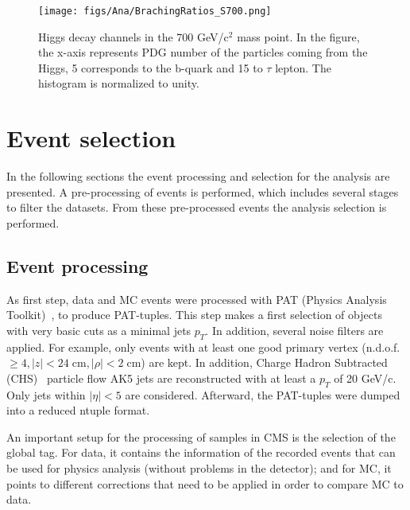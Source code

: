 \begin{figure}[!Hhtbp]
  \begin{center}
    \texttt{[image: figs/Ana/BrachingRatios\_S700.png]}
    \caption{Higgs decay channels in the 700 GeV/$\text{c}^{2}$ mass point. In the figure, the x-axis represents PDG number of the particles coming from the Higgs, 5 corresponds to the b-quark and 15 to $\tau$ lepton. The histogram is normalized to unity.}
    \label{fig:BR_Higgs_SignalSamples}
  \end{center}
\end{figure}


\section{Event selection}
\label{sec:sel}

In the following sections the event processing and selection for the analysis are presented. A pre-processing of events is performed, which includes several stages to filter the datasets. From these pre-processed events the analysis selection is performed.

\subsection{Event processing}

As first step, data and MC events were processed with PAT (Physics Analysis Toolkit)~\cite{Adam:2010zza}, to produce PAT-tuples. This step makes a first selection of objects with very basic cuts as a minimal jets $p_{T}$. In addition, several noise filters are applied. For example, only events with at least one good primary vertex (n.d.o.f. $\ge 4, |z|<24 \;\text{cm}, |\rho|< 2 \;\text{cm}$) are kept. In addition, Charge Hadron Subtracted (CHS)~\cite{Kirschenmann:1627818} particle flow AK5 jets are reconstructed with at least a $p_{T}$ of 20 GeV/c. Only jets within $|\eta|<5$ are considered. Afterward, the PAT-tuples were dumped into a reduced ntuple format. 

An important setup for the processing of samples in CMS is the selection of the global tag. For data, it contains the information of the recorded events that can be used for physics analysis (without problems in the detector); and for MC, it points to different corrections that need to be applied in order to compare MC to data.

